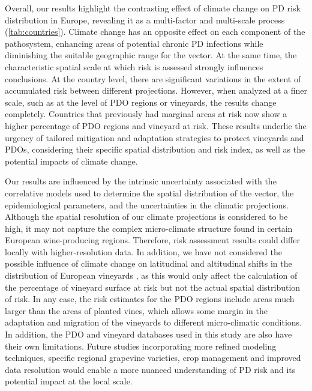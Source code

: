 Overall, our results highlight the contrasting effect of climate change on
PD risk distribution in Europe, revealing it as a multi-factor and multi-scale
process (\cref{tab:countries}). Climate change has an opposite effect on each
component of the pathosystem, enhancing areas of potential chronic PD
infections while diminishing the suitable geographic range for the vector. At
the same time, the characteristic spatial scale at which risk is assessed
strongly influences conclusions. At the country level, there are significant
variations in the extent of accumulated risk between different projections.
However, when analyzed at a finer scale, such as at the level of PDO regions or
vineyards, the results change completely. Countries that previously had
marginal areas at risk now show a higher percentage of PDO regions and vineyard
at risk. These results underlie the urgency of tailored mitigation and
adaptation strategies to protect vineyards and PDOs, considering their specific
spatial distribution and risk index, as well as the potential impacts of
climate change.

Our results are influenced by the intrinsic uncertainty associated with the
correlative models used to determine the spatial distribution of the vector,
the epidemiological parameters, and the uncertainties in the climatic
projections. Although the spatial resolution of our climate projections is
considered to be high, it may not capture the complex micro-climate structure
found in certain European wine-producing regions. Therefore, risk assessment
results could differ locally with higher-resolution data. In addition, we have
not considered the possible influence of climate change on latitudinal and
altitudinal shifts in the distribution of European vineyards
\cite{hannah2013climate,moriondo2013projected}, as this would only affect the
calculation of the percentage of vineyard surface at risk but not the actual
spatial distribution of risk. In any case, the risk estimates for the PDO
regions include areas much larger than the areas of planted vines, which allows
some margin in the adaptation and migration of the vineyards to different
micro-climatic conditions. In addition, the PDO and vineyard databases used in
this study are also have their own limitations. Future studies incorporating
more refined modeling techniques, specific regional grapevine varieties, crop
management and improved data resolution would enable a more nuanced
understanding of PD risk and its potential impact at the local scale.

